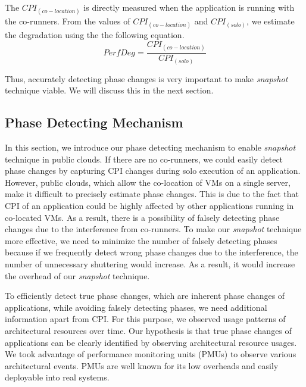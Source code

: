 \documentclass{sig-alternate}
\begin{document}
The $CPI_{(co-location)}$ is directly measured when the application is running with the co-runners.  From the values of $CPI_{(co-location)}$ and $CPI_{(solo)}$, we estimate the degradation using the the following equation. 
\begin{equation} \label{eq:degradation_equation}
PerfDeg = \dfrac{CPI_{(co-location)}}{CPI_{(solo)}}
\end{equation}

Thus, accurately detecting phase changes is very important to make \textit{snapshot} technique viable. We will discuss this in the next section.
\subsection{Phase Detecting Mechanism}
\label{subsec:PhaseDetectingMechanism}

In this section, we introduce our phase detecting mechanism to enable \textit{snapshot} technique in public clouds. 
If there are no co-runners, we could easily detect phase changes by capturing CPI changes during solo execution of an application. However, public clouds, which allow the co-location of VMs on a single server, make it difficult to precisely estimate phase changes. This is due to the fact that CPI of an application could be highly affected by other applications running in co-located VMs. As a result, there is a possibility of falsely detecting phase changes due to the interference from co-runners. To make our \textit{snapshot} technique more effective, we need to minimize the number of falsely detecting phases because if we frequently detect wrong phase changes due to the interference, the number of unnecessary shuttering would increase. As a result, it would increase the overhead of our \textit{snapshot} technique. 

To efficiently detect true phase changes, which are inherent phase changes of applications, while avoiding falsely detecting phases, we need additional information apart from CPI. For this purpose, we observed usage patterns of architectural resources over time. Our hypothesis is that true phase changes of applications can be clearly identified by observing architectural resource usages. We took advantage of performance monitoring units (PMUs) to observe various architectural events. PMUs are well known for its low overheads and easily deployable into real systems.
\end{document}

